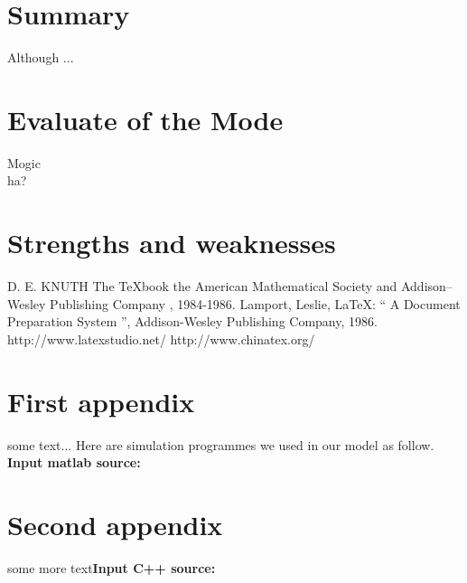 \section{Summary}
Although ...


\section{Evaluate of the Mode}
Mogic\\
ha?


\section{Strengths and weaknesses}


\begin{thebibliography}{99}
 D. E. KNUTH   The \TeX{}book  the American
Mathematical Society and Addison–Wesley
Publishing Company , 1984-1986.
Lamport, Leslie,  \LaTeX{}: `` A Document Preparation System '',
Addison-Wesley Publishing Company, 1986.
http://www.latexstudio.net/
http://www.chinatex.org/
\end{thebibliography}


\begin{appendices}
\section{First appendix}
some text...
Here are simulation programmes we used in our model as follow.\\
\textbf{\textcolor[rgb]{0.98,0.00,0.00}{Input matlab source:}}



\section{Second appendix}
some more text\textcolor[rgb]{0.98,0.00,0.00}{\textbf{Input C++ source:}}


\end{appendices}
